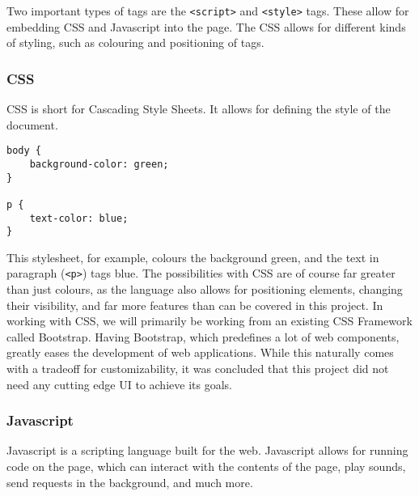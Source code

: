 Two important types of tags are the \texttt{<script>} and \texttt{<style>} tags.
These allow for embedding CSS and Javascript into the page.
The CSS allows for different kinds of styling, such as colouring and positioning of tags.
\subsubsection{CSS}
CSS is short for Cascading Style Sheets. It allows for defining the style of the document.
\begin{lstlisting}
body {
	background-color: green;
}

p {
	text-color: blue;
}
\end{lstlisting}
This stylesheet, for example, colours the background green, and the text in paragraph (\texttt{<p>}) tags blue. The possibilities with CSS are of course far greater than just colours, as the language also allows for positioning elements, changing their visibility, and far more features than can be covered in this project.\cite{nixonweb}
In working with CSS, we will primarily be working from an existing CSS Framework called Bootstrap. Having Bootstrap, which predefines a lot of web components, greatly eases the development of web applications. While this naturally comes with a tradeoff for customizability, it was concluded that this project did not need any cutting edge UI to achieve its goals.
\subsubsection{Javascript}
Javascript is a scripting language built for the web.
Javascript allows for running code on the page, which can interact with the contents of the page, play sounds, send requests in the background, and much more.\cite{nixonweb}
